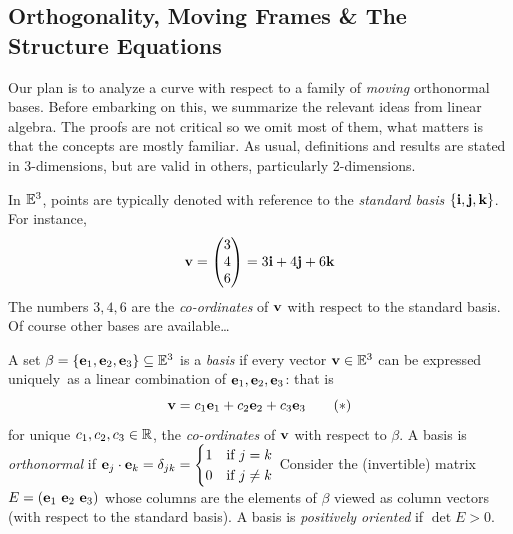 \subsection{Orthogonality, Moving Frames \& The Structure Equations}\label{sec:orth}

Our plan is to analyze a curve with respect to a family of \emph{moving} orthonormal bases. Before embarking on this, we summarize the relevant ideas from linear algebra. The proofs are not critical so we omit most of them, what matters is that the concepts are mostly familiar. As usual, definitions and results are stated in 3-dimensions, but are valid in others, particularly 2-dimensions.\medbreak

In $\mathbb{E}^3$, points are typically denoted with reference to the \emph{standard basis} $\{{\mathbf{i}},{\mathbf{j}},{\mathbf{k}}\}$. For instance,
\[{\mathbf{v}}=\begin{pmatrix}3\\4\\6\end{pmatrix}=3{\mathbf{i}}+4{\mathbf{j}}+6{\mathbf{k}}\]
The numbers $3,4,6$ are the \emph{co-ordinates} of ${\mathbf{v}}$ with respect to the standard basis. Of course other bases are available\ldots

\begin{defn}{}{}
A set $\beta=\{{\mathbf{e}}_1,{\mathbf{e}}_2,{\mathbf{e}}_3\}\subseteq\mathbb{E}^3$ is a \emph{basis} if every vector ${\mathbf{v}}\in\mathbb{E}^3$ can be expressed uniquely\footnotemark\ as a linear combination of ${\mathbf{e}}_1,{\mathbf{e}}_2,{\mathbf{e}}_3$: that is
\[{\mathbf{v}}=c_1{\mathbf{e}}_1+c_2{\mathbf{e}}_2+c_3{\mathbf{e}}_3\tag{$\ast$}\]
for unique $c_1,c_2,c_3\in\mathbb{R}$, the \emph{co-ordinates} of ${\mathbf{v}}$ with respect to $\beta$.\smallbreak
A basis is \emph{orthonormal} if ${\mathbf{e}}_j\cdot{\mathbf{e}}_k=\delta_{jk}=\begin{cases}
1&\text{if }j=k\\
0&\text{if }j\neq k
\end{cases}$\smallbreak
Consider the (invertible) matrix $E=({\mathbf{e}}_1\ {\mathbf{e}}_2\ {\mathbf{e}}_3)$ whose columns are the elements of $\beta$ viewed as column vectors (with respect to the standard basis). A basis is \emph{positively oriented} if $\det E>0$.
\end{defn}



